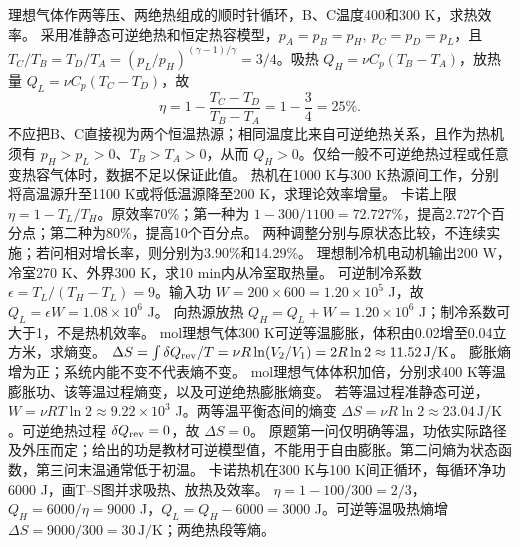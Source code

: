 \problemtext 理想气体作两等压、两绝热组成的顺时针循环，B、C温度400和300 K，求热效率。
\workings 采用准静态可逆绝热和恒定热容模型，$p_A=p_B=p_H,\ p_C=p_D=p_L$，且 $T_C/T_B=T_D/T_A=(p_L/p_H)^{(\gamma-1)/\gamma}=3/4$。吸热 $Q_H=\nu C_p(T_B-T_A)$，放热量 $Q_L=\nu C_p(T_C-T_D)$，故
\[
\eta=1-\frac{T_C-T_D}{T_B-T_A}=1-\frac34=25\%.
\]
\crosscheck 不应把B、C直接视为两个恒温热源；相同温度比来自可逆绝热关系，且作为热机须有 $p_H>p_L>0$、$T_B>T_A>0$，从而 $Q_H>0$。仅给一般不可逆绝热过程或任意变热容气体时，数据不足以保证此值。
\problemtext 热机在1000 K与300 K热源间工作，分别将高温源升至1100 K或将低温源降至200 K，求理论效率增量。
\workings 卡诺上限 $\eta=1-T_L/T_H$。原效率70\%；第一种为 $1-300/1100=72.727\%$，提高2.727个百分点；第二种为80\%，提高10个百分点。
\crosscheck 两种调整分别与原状态比较，不连续实施；若问相对增长率，则分别为3.90\%和14.29\%。
\problemtext 理想制冷机电动机输出200 W，冷室270 K、外界300 K，求10 min内从冷室取热量。
\workings 可逆制冷系数 $\epsilon=T_L/(T_H-T_L)=9$。输入功 $W=200\times600=1.20\times10^5$ J，故 $Q_L=\epsilon W=1.08\times10^6$ J。
\crosscheck 向热源放热 $Q_H=Q_L+W=1.20\times10^6$ J；制冷系数可大于1，不是热机效率。
 mol理想气体300 K可逆等温膨胀，体积由0.02增至0.04立方米，求熵变。
\workings $\Delta S=\int\delta Q_{\rm rev}/T=\nu R\ln(V_2/V_1)=2R\ln2\approx11.52\,\mathrm{J/K}$。
\crosscheck 膨胀熵增为正；系统内能不变不代表熵不变。
 mol理想气体体积加倍，分别求400 K等温膨胀功、该等温过程熵变，以及可逆绝热膨胀熵变。
\workings 若等温过程准静态可逆，$W=\nu RT\ln2\approx9.22\times10^3$ J。两等温平衡态间的熵变 $\Delta S=\nu R\ln2\approx23.04\,\mathrm{J/K}$。可逆绝热过程 $\delta Q_{\rm rev}=0$，故 $\Delta S=0$。
\crosscheck 原题第一问仅明确等温，功依实际路径及外压而定；给出的功是教材可逆模型值，不能用于自由膨胀。第二问熵为状态函数，第三问末温通常低于初温。
\problemtext 卡诺热机在300 K与100 K间正循环，每循环净功6000 J，画T--S图并求吸热、放热及效率。
\workings $\eta=1-100/300=2/3$，$Q_H=6000/\eta=9000$ J，$Q_L=Q_H-6000=3000$ J。可逆等温吸热熵增 $\Delta S=9000/300=30\,\mathrm{J/K}$；两绝热段等熵。
\begin{center}
\end{center}
